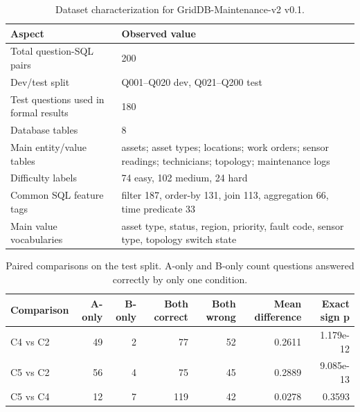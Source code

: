 \documentclass[11pt]{article}
\begin{document}
\begin{table}[htbp]
\caption{Dataset characterization for GridDB-Maintenance-v2 v0.1.}
\label{tab:sup-dataset}
\centering
\small
\begin{tabularx}{\textwidth}{lX}
\toprule
\textbf{Aspect} & \textbf{Observed value} \\
\midrule
Total question-SQL pairs & 200 \\
Dev/test split & Q001--Q020 dev, Q021--Q200 test \\
Test questions used in formal results & 180 \\
Database tables & 8 \\
Main entity/value tables & assets; asset types; locations; work orders; sensor readings; technicians; topology; maintenance logs \\
Difficulty labels & 74 easy, 102 medium, 24 hard \\
Common SQL feature tags & filter 187, order-by 131, join 113, aggregation 66, time predicate 33 \\
Main value vocabularies & asset type, status, region, priority, fault code, sensor type, topology switch state \\
\bottomrule
\end{tabularx}
\end{table}

\begin{table}[htbp]
\caption{Paired comparisons on the test split. A-only and B-only count questions answered correctly by only one condition.}
\label{tab:sup-paired}
\centering
\small
\begin{tabular*}{\textwidth}{@{\extracolsep{\fill}}lrrrrrr}
\toprule
\textbf{Comparison} & \textbf{A-only} & \textbf{B-only} & \textbf{Both correct} & \textbf{Both wrong} & \textbf{Mean difference} & \textbf{Exact sign p} \\
\midrule
C4 vs C2 & 49 & 2 & 77 & 52 & 0.2611 & 1.179e-12 \\
C5 vs C2 & 56 & 4 & 75 & 45 & 0.2889 & 9.085e-13 \\
C5 vs C4 & 12 & 7 & 119 & 42 & 0.0278 & 0.3593 \\
\bottomrule
\end{tabular*}
\end{table}
\end{document}
